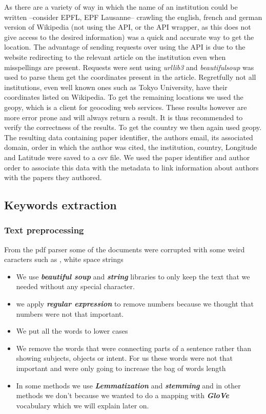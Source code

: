 \documentclass[article,twocolumn]{IEEEtran}
\begin{document}
As there are a variety of way in which the name of an institution could
be written --consider EPFL, EPF Lausanne-- crawling the english, french
and german version of Wikipedia (not using the API, or the API wrapper,
as this does not give access to the desired information) was a quick and
accurate way to get the location. The advantage of sending requests over
using the API is due to the website redirecting to the relevant article
on the institution even when misspellings are present. Requests were
sent using \emph{urllib3} and \emph{beautifulsoup} was used to parse
them get the coordinates present in the article. Regretfully not all
institutions, even well known ones such as Tokyo University, have their
coordinates listed on Wikipedia. To get the remaining locations we used
the geopy, which is a client for geocoding web services. These results
however are more error prone and will always return a result. It is thus
recommended to verify the correctness of the results. To get the country
we then again used geopy. The resulting data containing paper
identifier, the authors email, its associated domain, order in which the
author was cited, the institution, country, Longitude and Latitude were
saved to a csv file. We used the paper identifier and author order to
associate this data with the metadata to link information about authors
with the papers they authored.

    \hypertarget{keywords-extraction}{%
\subsection{Keywords extraction}\label{keywords-extraction}}

    \hypertarget{text-preprocessing}{%
\subsubsection{Text preprocessing}\label{text-preprocessing}}

    From the pdf parser some of the documents were corrupted with some weird
caracters such as , white space strings

\begin{itemize}
\item
  We use \textbf{\emph{beautiful soup}} and \textbf{\emph{string}}
  libraries to only keep the text that we needed without any special
  character.
\item
  we apply \textbf{\emph{regular expression}} to remove numbers because
  we thought that numbers were not that important.
\item
  We put all the words to lower cases
\item
  We remove the words that were connecting parts of a sentence rather
  than showing subjects, objects or intent. For us these words were not
  that important and were only going to increase the bag of words length
\item
  In some methods we use \textbf{\emph{Lemmatization}} and
  \textbf{\emph{stemming}} and in other methods we don't because we
  wanted to do a mapping with \textbf{\emph{GloVe}} vocabulary which we
  will explain later on.
\end{itemize}
\end{document}
